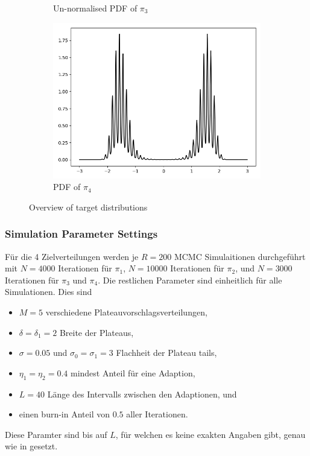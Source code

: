 \documentclass{scrartcl}
\begin{document}
\begin{figure}
\begin{subfigure}{.45\textwidth}
              \caption{Un-normalised PDF of $\pi_3$}
              \label{target_distributions_pi_3}
        \end{subfigure}
        \begin{subfigure}{.45\textwidth}
              \centering
              \includegraphics[width=.8\linewidth]{../figs/fig_3_pi_4.png}
              \caption{PDF of $\pi_4$}
              \label{target_distributions_pi_4}
        \end{subfigure}
        \caption{Overview of target distributions}
        \label{target_distributions}
    \end{figure}

    \subsubsection{Simulation Parameter Settings}
    Für die 4 Zielverteilungen werden je $R=200$ MCMC Simulaitionen durchgeführt mit $N=4000$ Iterationen für $\pi_1$, $N=10000$ Iterationen für $\pi_2$, und $N=3000$ Iterationen für $\pi_3$ und $\pi_4$.
    Die restlichen Parameter sind einheitlich für alle Simulationen. Dies sind
    \begin{itemize}
        \item $M=5$ verschiedene Plateauvorschlagsverteilungen,
        \item $\delta=\delta_1=2$ Breite der Plateaus,
        \item $\sigma=0.05$ und $\sigma_0=\sigma_1=3$ Flachheit der Plateau tails,
        \item $\eta_1=\eta_2=0.4$ mindest Anteil für eine Adaption,
        \item $L=40$ Länge des Intervalls zwischen den Adaptionen, und
        \item einen burn-in Anteil von $0.5$ aller Iterationen.
    \end{itemize}
    Diese Paramter sind bis auf $L$, für welchen es keine exakten Angaben gibt, genau wie in \cite{lau2019} gesetzt.
\end{document}
